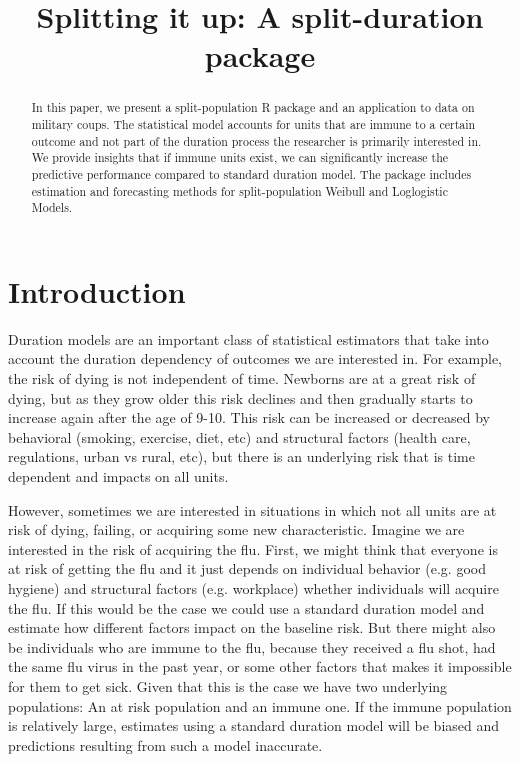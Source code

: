 \documentclass[letter]{article}
\begin{document}
\title{Splitting it up: A split-duration package}

\maketitle

\begin{abstract}
In this paper, we present a split-population R package and an application to data on military coups. The statistical model accounts for units that are immune to a certain outcome and not part of the duration process the researcher is primarily interested in. We provide insights that if immune units exist, we can significantly increase the predictive performance compared to standard duration model. The package includes estimation and forecasting methods for split-population Weibull and Loglogistic Models.
\end{abstract}

\section{Introduction}
Duration models are an important class of statistical estimators that take into account the duration dependency of outcomes we are interested in. For example, the risk of dying is not independent of time. Newborns are at a great risk of dying, but as they grow older this risk declines and then gradually starts to increase again after the age of 9-10. This risk can be increased or decreased by behavioral (smoking, exercise, diet, etc) and structural factors (health care, regulations, urban vs rural, etc), but there is an underlying risk that is time dependent and impacts on all units. 

However, sometimes we are interested in situations in which not all units are at risk of dying, failing, or acquiring some new characteristic. Imagine we are interested in the risk of acquiring the flu. First, we might think that everyone is at risk of getting the flu and it just depends on individual behavior (e.g. good hygiene) and structural factors (e.g. workplace) whether individuals will acquire the flu. If this would be the case we could use a standard duration model and estimate how different factors impact on the baseline risk. But there might also be individuals who are immune to the flu, because they received a flu shot, had the same flu virus in the past year, or some other factors that makes it impossible for them to get sick. Given that this is the case we have two underlying populations: An at risk population and an immune one. If the immune population is relatively large, estimates using a standard duration model will be biased and predictions resulting from such a model inaccurate.
\end{document}
